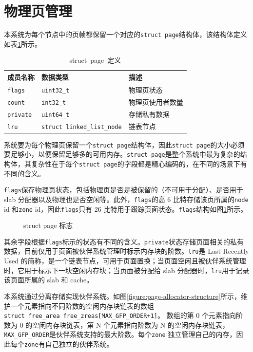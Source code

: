 \documentclass[AutoFakeBold]{LZUThesis}
\begin{document}
\begin{sloppypar}
\section{物理页管理}

本系统为每个节点中的页帧都保留一个对应的\texttt{struct\ page}结构体，该结构体定义如表\ref{table:struct-page-definition}所示。

\begin{longtable}[htb]{@{}lll@{}}
\caption{struct\ page\ 定义}\label{table:struct-page-definition} \\
\toprule\noalign{}
成员名称 & 数据类型 & 描述 \\
\midrule\noalign{}
\endhead
\bottomrule\noalign{}
\endlastfoot
\texttt{flags} & \texttt{uint32\_t} & 物理页状态 \\
\texttt{count} & \texttt{int32\_t} & 物理页使用者数量 \\
\texttt{private} & \texttt{uint64\_t} & 存储私有数据 \\
\texttt{lru} & \texttt{struct\ linked\_list\_node} & 链表节点 \\
\end{longtable}

系统要为每个物理页保留一个\texttt{struct\ page}结构体，因此\texttt{struct\ page}的大小必须要足够小，以便保留足够多的可用内存。\texttt{struct\ page}是整个系统中最为复杂的结构体，其复杂性在于每个\texttt{struct\ page}的字段都是精心编码的，在不同的场景下有不同的含义。

\texttt{flags}保存物理页状态，包括物理页是否是被保留的（不可用于分配）、是否用于 slab 分配器以及物理也是否空闲等。此外，\texttt{flags}的高 6 比特存储该页所属的\texttt{node} id 和\texttt{zone} id，因此\texttt{flags}只有 26 比特用于跟踪页面状态。\texttt{flags}结构如图\ref{fig:struct-page-flags}所示。

\begin{figure}[H]
\centering

\caption{struct page 标志}
\label{fig:struct-page-flags}
\end{figure}

其余字段根据\texttt{flags}标示的状态有不同的含义。\texttt{private}状态存储页面相关的私有数据，目前仅用于页面被伙伴系统管理时标示内存块的阶数。\texttt{lru}是
Last Recently Used 的简称，是一个链表节点，可用于页面置换；当页面空闲且被伙伴系统管理时，它用于标示下一块空闲内存块；当页面被分配给
slab 分配器时，\texttt{lru}用于记录该页面所属的 slab 和 cache。

本系统通过分离存储实现伙伴系统。如图\ref{figure:page-allocator-structure}所示，维护一个元素指向不同阶数的空闲内存块链表的数组\texttt{struct\ free\_area\ free\_zreas{[}MAX\_GFP\_ORDER+1{]}}。
数组的第 0 个元素指向阶数为 0 的空闲内存块链表，第 N
个元素指向阶数为 N 的空闲内存块链表，\texttt{MAX\_GFP\_ORDER}是伙伴系统支持的最大阶数。每个\texttt{zone}
独立管理自己的内存，因此每个\texttt{zone}有自己独立的伙伴系统。


\end{sloppypar}
\end{document}

